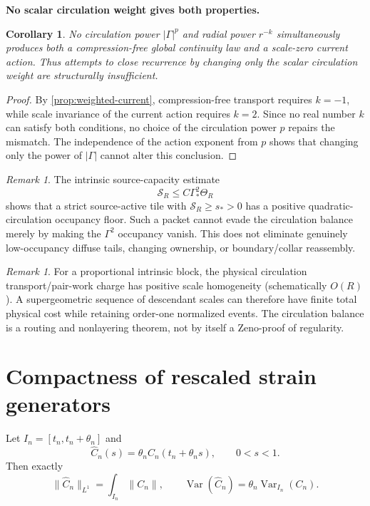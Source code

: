 \documentclass[11pt]{article}
\newtheorem{corollary}[theorem]{Corollary}
\theoremstyle{definition}\newtheorem{definition}[theorem]{Definition}
\theoremstyle{remark}\newtheorem{remark}[theorem]{Remark}
\begin{document}
\medskip
\noindent\textbf{No scalar circulation weight gives both properties.}
\begin{corollary}
No circulation power $|\Gamma|^p$ and radial power $r^{-k}$ simultaneously
produces both a compression-free global continuity law and a scale-zero
current action.  Thus attempts to close recurrence by changing only the scalar
circulation weight are structurally insufficient.
\end{corollary}
\begin{proof}
By \cref{prop:weighted-current}, compression-free transport requires $k=-1$, while scale invariance of the current action requires $k=2$.  Since no real number $k$ can satisfy both conditions, no choice of the circulation power $p$ repairs the mismatch.  The independence of the action exponent from $p$ shows that changing only the power of $|\Gamma|$ cannot alter this conclusion.
\end{proof}

\begin{remark}
The intrinsic source-capacity estimate
\[
 \mathcal S_R\le C\Gamma_*^2\Theta_R
\]
shows that a strict source-active tile with $\mathcal S_R\ge s_*>0$ has a
positive quadratic-circulation occupancy floor.  Such a packet cannot evade
the circulation balance merely by making the $\Gamma^2$ occupancy vanish.  This does not
eliminate genuinely low-occupancy diffuse tails, changing ownership, or
boundary/collar reassembly.
\end{remark}

\begin{remark}
For a proportional intrinsic block, the physical circulation transport/pair-work
charge has positive scale homogeneity (schematically $O(R)$).  A supergeometric
sequence of descendant scales can therefore have finite total physical cost while
retaining order-one normalized events.  The circulation balance is a routing and
nonlayering theorem, not by itself a Zeno-proof of regularity.
\end{remark}

\section{Compactness of rescaled strain generators}
Let $I_n=[t_n,t_n+\theta_n]$ and
\[
\widehat C_n(s)=\theta_n C_n(t_n+\theta_ns),\qquad 0<s<1.
\]
Then exactly
\[
\|\widehat C_n\|_{L^1}=\int_{I_n}\|C_n\|,
\qquad
\operatorname{Var}(\widehat C_n)=\theta_n\operatorname{Var}_{I_n}(C_n).
\]
\end{document}
